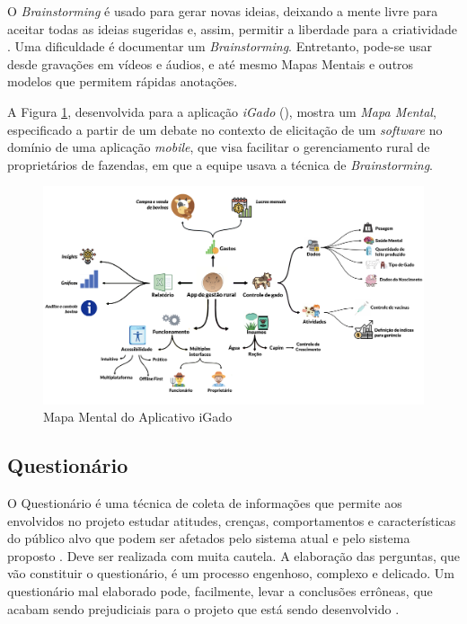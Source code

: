 O \textit{Brainstorming} é usado para gerar novas ideias, deixando a mente livre para aceitar todas as ideias sugeridas e, assim, permitir a liberdade para a criatividade \cite{batista2003taxonomia}. Uma dificuldade é documentar um \textit{Brainstorming}. Entretanto, pode-se usar desde gravações em vídeos e áudios, e até mesmo Mapas Mentais e outros modelos que permitem rápidas anotações.

A Figura \ref{fig:mind_map}, desenvolvida para a aplicação \textit{iGado} (), mostra um \textit{Mapa Mental}, especificado a partir de um debate no contexto de elicitação de um \textit{software} no domínio de uma aplicação \textit{mobile}, que visa facilitar o gerenciamento rural de proprietários de fazendas, em que a equipe usava a técnica de \textit{Brainstorming}.

\begin{figure}[H]
    \begin{center}
        \caption{Mapa Mental do Aplicativo iGado}
        \label{fig:mind_map}
        \includegraphics[scale=0.25]{figuras/Embasamento/MindMap_v2.png}
    \end{center}
\end{figure}

\subsection{Questionário}

\label{sec:questionario}

O Questionário é uma técnica de coleta de informações que permite aos envolvidos no projeto estudar atitudes, crenças, comportamentos e características do público alvo que podem ser afetados pelo sistema atual e pelo sistema proposto \cite{kendall1992systems}. Deve ser realizada com muita cautela. A elaboração das perguntas, que vão constituir o questionário, é um processo engenhoso, complexo e delicado. Um questionário mal elaborado pode, facilmente, levar a conclusões errôneas, que acabam sendo prejudiciais para o projeto que está sendo desenvolvido \cite{bastosjunior}.

